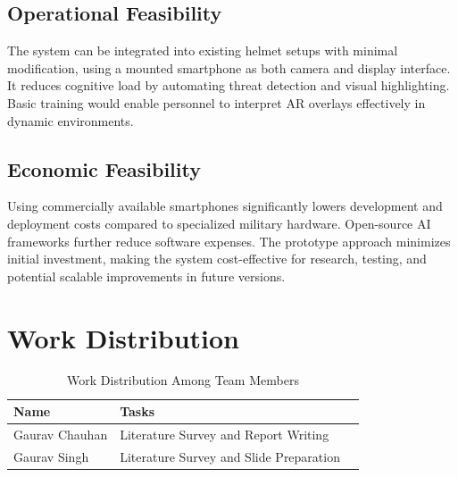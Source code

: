 \subsection{Operational Feasibility}
The system can be integrated into existing helmet setups with minimal modification, using a mounted
smartphone as both camera and display interface. It reduces cognitive load by automating threat
detection and visual highlighting. Basic training would enable personnel to interpret AR overlays
effectively in dynamic environments.

\subsection{Economic Feasibility}
Using commercially available smartphones significantly lowers development and deployment costs
compared to specialized military hardware. Open-source AI frameworks further reduce software
expenses. The prototype approach minimizes initial investment, making the system cost-effective for
research, testing, and potential scalable improvements in future versions.

\label{end:feasibility}
\section{Work Distribution}\label{sec:work}
\begin{table}[h]
  \centering
  \caption{Work Distribution Among Team Members}\label{tab:work}
  \begin{tabular}{lll}
    \toprule
    \textbf{Name} & \textbf{Tasks} \\
    \midrule
    Gaurav Chauhan & Literature Survey and Report Writing \\
    Gaurav Singh & Literature Survey and Slide Preparation \\
    \bottomrule
  \end{tabular}
\end{table}
\label{end:work}\label{end:introduction}
